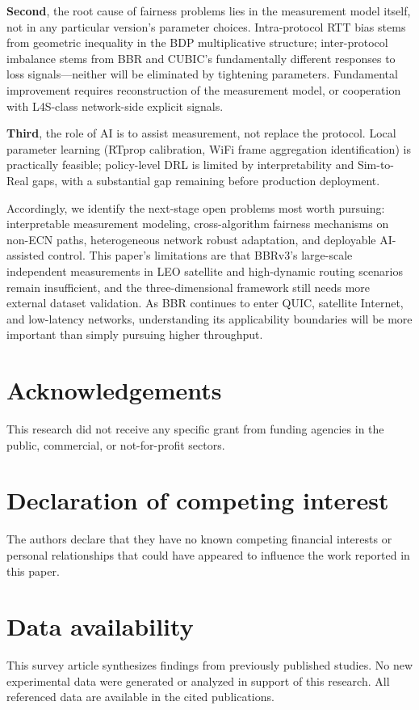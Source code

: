 \documentclass[a4paper,fleqn]{cas-sc}
\begin{document}
\textbf{Second}, the root cause of fairness problems lies in the measurement model
itself, not in any particular version's parameter choices. Intra-protocol RTT bias
stems from geometric inequality in the BDP multiplicative structure;
inter-protocol imbalance stems from BBR and CUBIC's fundamentally different
responses to loss signals---neither will be eliminated by tightening parameters.
Fundamental improvement requires reconstruction of the measurement model, or
cooperation with L4S-class network-side explicit signals.

\textbf{Third}, the role of AI is to assist measurement, not replace the protocol.
Local parameter learning (RTprop calibration, WiFi frame aggregation
identification) is practically feasible; policy-level DRL is limited by
interpretability and Sim-to-Real gaps, with a substantial gap remaining before
production deployment.

Accordingly, we identify the next-stage open problems most worth pursuing:
interpretable measurement modeling, cross-algorithm fairness mechanisms on
non-ECN paths, heterogeneous network robust adaptation, and deployable AI-assisted
control. This paper's limitations are that BBRv3's large-scale independent
measurements in LEO satellite and high-dynamic routing scenarios remain
insufficient, and the three-dimensional framework still needs more external dataset
validation. As BBR continues to enter QUIC, satellite Internet, and low-latency
networks, understanding its applicability boundaries will be more important than
simply pursuing higher throughput.

\section*{Acknowledgements}
This research did not receive any specific grant from funding agencies in the
public, commercial, or not-for-profit sectors.

\section*{Declaration of competing interest}
The authors declare that they have no known competing financial interests or
personal relationships that could have appeared to influence the work reported
in this paper.

\section*{Data availability}
This survey article synthesizes findings from previously published studies.
No new experimental data were generated or analyzed in support of this research.
All referenced data are available in the cited publications.
\end{document}
